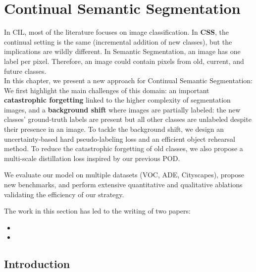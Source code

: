 \chapter{Continual Semantic Segmentation}
\label{chapter:segmentation}

\begin{chapabstract}
    In \acf{CIL},  most of the literature focuses on image classification. In \textbf{\acf{CSS}},
    the continual setting is the same (incremental addition of new classes), but the implications
    are wildly different. In Semantic Segmentation, an image has one label per pixel. Therefore, an
    image could contain pixels from old, current, and future classes. \\
    In this chapter, we present a new approach for Continual Semantic Segmentation: We first
    highlight the main challenges of this domain: an important \textbf{catastrophic forgetting}
    linked to the higher complexity of segmentation images, and a \textbf{background shift} where
    images are partially labeled: the new classes' ground-truth labels are present but all other
    classes are unlabeled despite their presence in an image. To tackle the background shift, we
    design an uncertainty-based hard pseudo-labeling loss and an efficient object rehearsal method.
    To reduce the catastrophic forgetting of old classes, we also propose a multi-scale distillation
    loss inspired by our previous POD.

    We evaluate our model on multiple datasets (\eg VOC, ADE, Cityscapes), propose new benchmarks,
    and perform extensive quantitative and qualitative ablations validating the efficiency of our
    strategy.

    The work in this section has led to the writing of two papers:

    \begin{itemize}
        \item {}
        \item {}
    \end{itemize}

\end{chapabstract}
\newpage

\minitoc
{}



\section{Introduction}
\label{sec:seg_intro}

